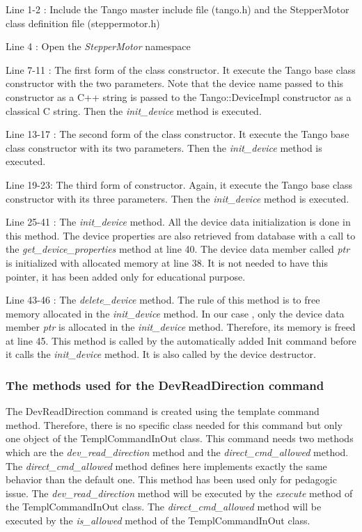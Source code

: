 Line 1-2 : Include the Tango master include file (tango.h) and the
StepperMotor class definition file (steppermotor.h)

Line 4 : Open the \emph{StepperMotor} namespace

Line 7-11 : The first form of the class constructor. It execute the
Tango base class constructor with the two parameters. Note that the
device name passed to this constructor as a C++ string is passed to
the Tango::DeviceImpl constructor as a classical
C string. Then the \emph{init\_device} method
is executed.

Line 13-17 : The second form of the class constructor. It execute
the Tango base class constructor with its two parameters. Then the
\emph{init\_device} method is executed.

Line 19-23: The third form of constructor. Again, it execute the Tango
base class constructor with its three parameters. Then the \emph{init\_device}
method is executed.

Line 25-41 : The \emph{init\_device} method. All
the device data initialization is done in this method. The device
properties are also retrieved from database with a call to the \emph{get\_device\_properties}
method at line 40. The device data member called \emph{ptr} is initialized
with allocated memory at line 38. It is not needed to have this pointer,
it has been added only for educational purpose.

Line 43-46 : The \emph{delete\_device} method.
The rule of this method is to free memory allocated in the \emph{init\_device}
method. In our case , only the device data member \emph{ptr} is allocated
in the \emph{init\_device} method. Therefore, its memory is freed
at line 45. This method is called by the automatically added Init
command before it calls the \emph{init\_device} method. It is also
called by the device destructor.

\subsubsection{The methods used for the DevReadDirection command}

The DevReadDirection command is created using the template command
method. Therefore, there is no specific class needed for this command
but only one object of the TemplCommandInOut class. This command needs
two methods which are the \emph{dev\_read\_direction} method and the
\emph{direct\_cmd\_allowed} method. The \emph{direct\_cmd\_allowed}
method defines here implements exactly the same behavior than the
default one. This method has been used only for pedagogic issue. The
\emph{dev\_read\_direction} method will be executed by the \emph{execute}
method of the TemplCommandInOut class. The
\emph{direct\_cmd\_allowed} method will be executed by the \emph{is\_allowed}
method of the TemplCommandInOut class.

